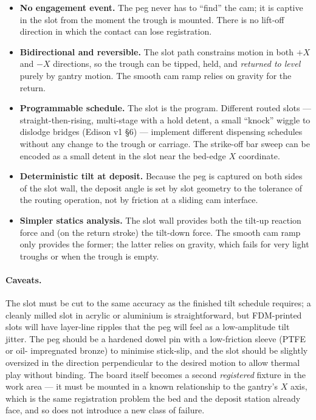 \documentclass[11pt,a4paper]{article}
\begin{document}
\begin{itemize}[leftmargin=*]
  \item \textbf{No engagement event.} The peg never has to ``find'' the
    cam; it is captive in the slot from the moment the trough is mounted.
    There is no lift-off direction in which the contact can lose registration.
  \item \textbf{Bidirectional and reversible.} The slot path constrains
    motion in both $+X$ and $-X$ directions, so the trough can be tipped,
    held, and \emph{returned to level} purely by gantry motion. The smooth
    cam ramp relies on gravity for the return.
  \item \textbf{Programmable schedule.} The slot is the program. Different
    routed slots --- straight-then-rising, multi-stage with a hold detent,
    a small ``knock'' wiggle to dislodge bridges (Edison v1 \S6) ---
    implement different dispensing schedules without any change to the
    trough or carriage. The strike-off bar sweep can be encoded as a small
    detent in the slot near the bed-edge $X$ coordinate.
  \item \textbf{Deterministic tilt at deposit.} Because the peg is captured
    on both sides of the slot wall, the deposit angle is set by slot
    geometry to the tolerance of the routing operation, not by friction at
    a sliding cam interface.
  \item \textbf{Simpler statics analysis.} The slot wall provides both the
    tilt-up reaction force and (on the return stroke) the tilt-down force.
    The smooth cam ramp only provides the former; the latter relies on
    gravity, which fails for very light troughs or when the trough is empty.
\end{itemize}

\paragraph{Caveats.} The slot must be cut to the same accuracy as the
finished tilt schedule requires; a cleanly milled slot in acrylic or
aluminium is straightforward, but FDM-printed slots will have layer-line
ripples that the peg will feel as a low-amplitude tilt jitter. The peg
should be a hardened dowel pin with a low-friction sleeve (PTFE or oil-
impregnated bronze) to minimise stick-slip, and the slot should be slightly
oversized in the direction perpendicular to the desired motion to allow
thermal play without binding. The board itself becomes a second
\emph{registered} fixture in the work area --- it must be mounted in a
known relationship to the gantry's $X$ axis, which is the same registration
problem the bed and the deposit station already face, and so does not
introduce a new class of failure.
\end{document}

